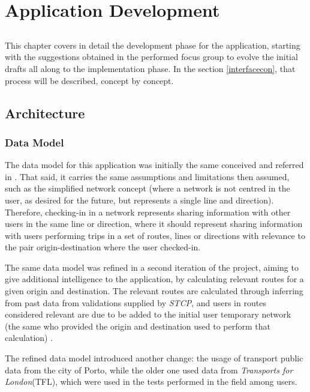\chapter{Application Development} \label{chap:chap5}

\section*{}

This chapter covers in detail the development phase for the application, starting with the suggestions obtained in the performed focus group to evolve the initial drafts all along to the implementation phase. In the section \ref{interfacecon}, that process will be described, concept by concept.

\section{Architecture}

\subsection{Data Model}

The data model for this application was initially the same conceived and referred in \cite{kn:eSG12}. That said, it carries the same assumptions and limitations then assumed, such as the simplified network concept (where a network is not centred in the user, as desired for the future, but represents a single line and direction).
Therefore, checking-in in a network represents sharing information with other users in the same line or direction, where it should represent sharing information with users performing trips in a set of routes, lines or directions with relevance to the pair origin-destination where the user checked-in.

The same data model was refined in a second iteration of the project, aiming to give additional intelligence to the application, by calculating relevant routes for a given origin and destination. The relevant routes are calculated through inferring from past data from validations supplied by \emph{STCP}, and users in routes considered relevant are due to be added to the initial user temporary network (the same who provided the origin and destination used to perform that calculation) \cite{kn:Dia13}.

The refined data model introduced another change: the usage of transport public data from the city of Porto, while the older one used data from \emph{Transports for London}(TFL), which were used in the tests performed in the field among users. 

